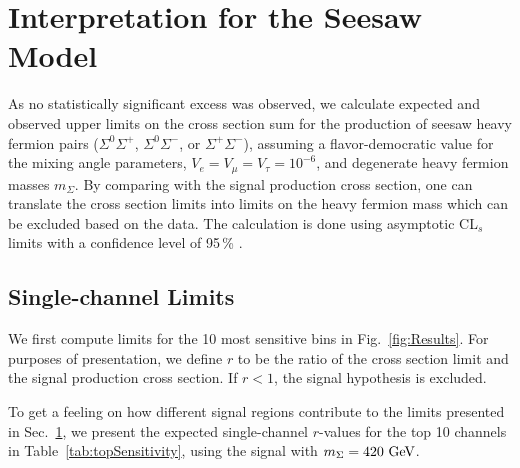 \section{Interpretation for the Seesaw Model}
\label{sec:Interpretation}
\label{sec:Interpretation/Seesaw}

As no statistically significant excess was observed, we calculate expected and observed upper limits on the cross section sum for the production of seesaw heavy fermion pairs ($\Sigma^0\Sigma^+$, $\Sigma^0\Sigma^-$, or $\Sigma^+\Sigma^-$), assuming a flavor-democratic value for the mixing angle parameters, $V_e = V_\mu = V_\tau = 10^{-6}$, and degenerate heavy fermion masses $m_\Sigma$.
By comparing with the signal production cross section, one can translate the cross section limits into limits on the heavy fermion mass which can be excluded based on the data.
The calculation is done using asymptotic CL$_s$ limits with a confidence level of 95\,\% \cite{Junk:1999kv,Read:2000ru,Read:2002hq}.

\subsection{Single-channel Limits}
\label{sec:Results/singleChannel}

We first compute limits for the 10 most sensitive bins in Fig.~\ref{fig:Results}. For purposes of presentation, we define $r$ to be the ratio of the cross section limit and the signal production cross section. If $r < 1$, the signal hypothesis is excluded.

To get a feeling on how different signal regions contribute to the limits presented in Sec.~\ref{sec:Interpretation}, we present the expected single-channel $r$-values for the top 10 channels in Table~\ref{tab:topSensitivity}, using the signal with $m_\Sigma = 420\,\,\text{Ge\hspace{-.08em}V}$.

